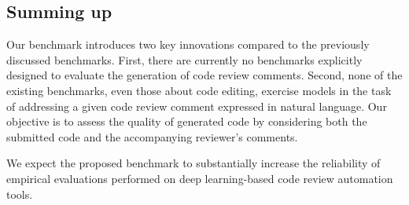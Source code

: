 \subsection{Summing up}

Our benchmark introduces two key innovations compared to the previously
discussed benchmarks. First, there are currently no benchmarks explicitly
designed to evaluate the generation of code review comments. Second, none of
the existing benchmarks, even those about code editing, exercise models in the
task of addressing a given code review comment expressed in natural language.
Our objective is to assess the quality of generated code by considering both
the submitted code and the accompanying reviewer's comments.

We expect the proposed benchmark to substantially increase the reliability of
empirical evaluations performed on deep learning-based code review automation
tools.
